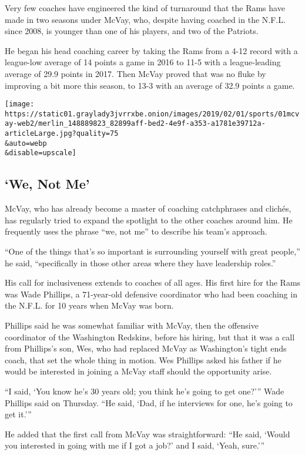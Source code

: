 Very few coaches have engineered the kind of turnaround that the Rams
have made in two seasons under McVay, who, despite having coached in the
N.F.L. since 2008, is younger than one of his players, and two of the
Patriots.

He began his head coaching career by taking the Rams from a 4-12 record
with a league-low average of 14 points a game in 2016 to 11-5 with a
league-leading average of 29.9 points in 2017. Then McVay proved that
was no fluke by improving a bit more this season, to 13-3 with an
average of 32.9 points a game.

\texttt{[image: https://static01.graylady3jvrrxbe.onion/images/2019/02/01/sports/01mcvay-web2/merlin\_148889823\_82899aff-bed2-4e9f-a353-a1781e39712a-articleLarge.jpg?quality=75\\\&auto=webp\\\&disable=upscale]}

\hypertarget{we-not-me}{%
\subsection{`We, Not Me'}\label{we-not-me}}

McVay, who has already become a master of coaching catchphrases and
clichés, has regularly tried to expand the spotlight to the other
coaches around him. He frequently uses the phrase ``we, not me'' to
describe his team's approach.

``One of the things that's so important is surrounding yourself with
great people,'' he said, ``specifically in those other areas where they
have leadership roles.''

His call for inclusiveness extends to coaches of all ages. His first
hire for the Rams was Wade Phillips, a 71-year-old defensive coordinator
who had been coaching in the N.F.L. for 10 years when McVay was born.

Phillips said he was somewhat familiar with McVay, then the offensive
coordinator of the Washington Redskins, before his hiring, but that it
was a call from Phillips's son, Wes, who had replaced McVay as
Washington's tight ends coach, that set the whole thing in motion. Wes
Phillips asked his father if he would be interested in joining a McVay
staff should the opportunity arise.

``I said, `You know he's 30 years old; you think he's going to get
one?''' Wade Phillips said on Thursday. ``He said, `Dad, if he
interviews for one, he's going to get it.'''

He added that the first call from McVay was straightforward: ``He said,
`Would you interested in going with me if I got a job?' and I said,
`Yeah, sure.'''

